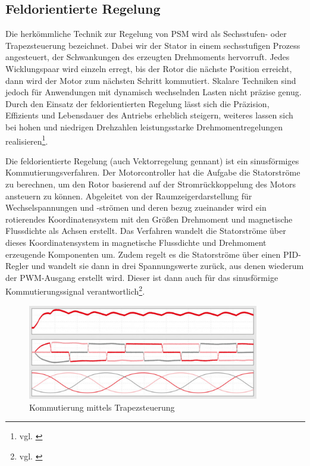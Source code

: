 \newpage
 
\subsection{Feldorientierte Regelung}
Die herkömmliche Technik zur Regelung von PSM wird als Sechsstufen- oder Trapezsteuerung bezeichnet. Dabei wir der Stator in einem sechsstufigen Prozess angesteuert, der Schwankungen des erzeugten Drehmoments hervorruft. Jedes Wicklungspaar wird einzeln erregt, bis der Rotor die nächste Position erreicht, dann wird der Motor zum nächsten Schritt kommutiert. Skalare Techniken sind jedoch für Anwendungen mit dynamisch wechselnden Lasten nicht präzise genug. Durch den Einsatz der feldorientierten Regelung lässt sich die Präzision, Effizients und Lebensdauer des Antriebs erheblich steigern, weiteres lassen sich bei hohen und niedrigen Drehzahlen leistungsstarke Drehmomentregelungen realisieren\footnote{vgl. \cite{Feldorientierte-Regelung}}.

Die feldorientierte Regelung (auch Vektorregelung gennant) ist ein sinusförmiges Kommutierungsverfahren. Der Motorcontroller hat die Aufgabe die Statorströme zu berechnen, um den Rotor basierend auf der Stromrückkoppelung des Motors ansteuern zu können. Abgeleitet von der Raumzeigerdarstellung für Wechselspannungen und -strömen und deren bezug zueinander wird ein rotierendes Koordinatensystem mit den Größen Drehmoment und magnetische Flussdichte als Achsen erstellt. Das Verfahren wandelt die Statorströme über dieses Koordinatensystem in magnetische Flussdichte und Drehmoment erzeugende Komponenten um. Zudem regelt es die Statorströme über einen PID-Regler und wandelt sie dann in drei Spannungswerte zurück, aus denen wiederum der PWM-Ausgang erstellt wird. Dieser ist dann auch für das sinusförmige Kommutierungssignal verantwortlich\footnote{vgl. \cite{Feldorientierte-Antriebssteuerung}}.
\\[7mm]
\begin{figure}[H]
	\begin{center}
		\includegraphics[width=0.9\textwidth]{figures/antrieb/Kommutierung_Trapezsteuerung.png}
		\caption{Kommutierung mittels Trapezsteuerung\cite{Feldorientierte-Antriebssteuerung}}
	\end{center}
\end{figure}

